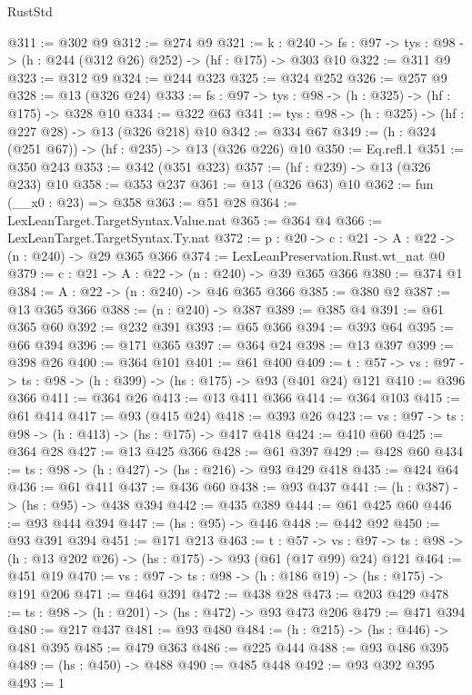 \begin{lexlean}{RustStd}
\begin{coremodule}
{\begin{coremodule}
{{{@311 := @302 @9
@312 := @274 @9
@321 := {k : @240} ->
  {fs : @97} -> {tys : @98} -> (h : @244 (@312 @26) @252) -> (hf : @175) -> @303 @10
@322 := @311 @9
@323 := @312 @9
@324 := @244 @323
@325 := @324 @252
@326 := @257 @9
@328 := @13 (@326 @24)
@333 := {fs : @97} -> {tys : @98} -> (h : @325) -> (hf : @175) -> @328 @10
@334 := @322 @63
@341 := {tys : @98} -> (h : @325) -> (hf : @227 @28) -> @13 (@326 @218) @10
@342 := @334 @67
@349 := (h : @324 (@251 @67)) -> (hf : @235) -> @13 (@326 @226) @10
@350 := Eq.refl.{1}
@351 := @350 @243
@353 := @342 (@351 @323)
@357 := (hf : @239) -> @13 (@326 @233) @10
@358 := @353 @237
@361 := @13 (@326 @63) @10
@362 := fun (__x0 : @23) => @358
@363 := @51 @28
@364 := LexLeanTarget.TargetSyntax.Value.nat
@365 := @364 @4
@366 := LexLeanTarget.TargetSyntax.Ty.nat
@372 := {p : @20} -> {c : @21} -> {A : @22} -> (n : @240) -> @29 @365 @366
@374 := LexLeanPreservation.Rust.wt_nat @0
@379 := {c : @21} -> {A : @22} -> (n : @240) -> @39 @365 @366
@380 := @374 @1
@384 := {A : @22} -> (n : @240) -> @46 @365 @366
@385 := @380 @2
@387 := @13 @365 @366
@388 := (n : @240) -> @387
@389 := @385 @4
@391 := @61 @365 @60
@392 := @232 @391
@393 := @65 @366
@394 := @393 @64
@395 := @66 @394
@396 := @171 @365
@397 := @364 @24
@398 := @13 @397
@399 := @398 @26
@400 := @364 @101
@401 := @61 @400
@409 := {t : @57} -> {vs : @97} -> {ts : @98} -> (h : @399) -> (hs : @175) -> @93 (@401 @24) @121
@410 := @396 @366
@411 := @364 @26
@413 := @13 @411 @366
@414 := @364 @103
@415 := @61 @414
@417 := @93 (@415 @24)
@418 := @393 @26
@423 := {vs : @97} -> {ts : @98} -> (h : @413) -> (hs : @175) -> @417 @418
@424 := @410 @60
@425 := @364 @28
@427 := @13 @425 @366
@428 := @61 @397
@429 := @428 @60
@434 := {ts : @98} -> (h : @427) -> (hs : @216) -> @93 @429 @418
@435 := @424 @64
@436 := @61 @411
@437 := @436 @60
@438 := @93 @437
@441 := (h : @387) -> (hs : @95) -> @438 @394
@442 := @435 @389
@444 := @61 @425 @60
@446 := @93 @444 @394
@447 := (hs : @95) -> @446
@448 := @442 @92
@450 := @93 @391 @394
@451 := @171 @213
@463 := {t : @57} ->
  {vs : @97} -> {ts : @98} -> (h : @13 @202 @26) -> (hs : @175) -> @93 (@61 (@17 @99) @24) @121
@464 := @451 @19
@470 := {vs : @97} -> {ts : @98} -> (h : @186 @19) -> (hs : @175) -> @191 @206
@471 := @464 @391
@472 := @438 @28
@473 := @203 @429
@478 := {ts : @98} -> (h : @201) -> (hs : @472) -> @93 @473 @206
@479 := @471 @394
@480 := @217 @437
@481 := @93 @480
@484 := (h : @215) -> (hs : @446) -> @481 @395
@485 := @479 @363
@486 := @225 @444
@488 := @93 @486 @395
@489 := (hs : @450) -> @488
@490 := @485 @448
@492 := @93 @392 @395
@493 := 1
}}}
\end{coremodule}}
\end{coremodule}
\end{lexlean}
